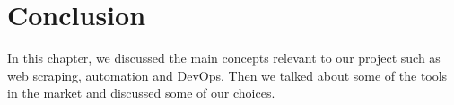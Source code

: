 \setcounter{secnumdepth}{0} %
\section{Conclusion}
In this chapter, we discussed the main concepts relevant to our project such as web scraping, automation and DevOps.
Then we talked about some of the tools in the market and discussed some of our choices.
